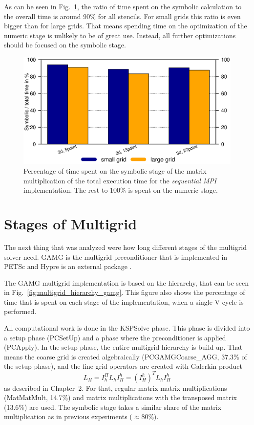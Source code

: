 As can be seen in Fig.~\ref{fig:mpi_symnum}, the ratio of time spent on the symbolic calculation to the overall time is around 90\% for all stencils. For small grids this ratio is even bigger than for large grids. That means spending time on the optimization of the numeric stage is unlikely to be of great use. Instead, all further optimizations should be focused on the symbolic stage. 

\begin{figure}[tbp]
	\centering
	\includegraphics[width=1\textwidth, trim={0 3.cm 0 7cm},clip]{mpi_symnum}
	\caption{Percentage of time spent on the symbolic stage of the matrix multiplication of the total execution time for the \textit{sequential MPI} implementation. The rest to 100\% is spent on the numeric stage.} 
	\label{fig:mpi_symnum}
\end{figure}

\section{Stages of Multigrid}
The next thing that was analyzed were how long different stages of the multigrid solver need. 
GAMG is the multigrid preconditioner that is implemented in PETSc and Hypre is an external package \cite{hypre-web-page}. 

The GAMG multigrid implementation is based on the hierarchy, that can be seen in Fig.~\ref{fig:multigrid_hierarchy_gamg}. This figure also shows the percentage of time that is spent on each stage of the implementation, when a single V-cycle is performed. 

All computational work is done in the KSPSolve phase. This phase is divided into a setup phase (PCSetUp) and a phase where the preconditioner is applied (PCApply). In the setup phase, the entire multigrid hierarchy is build up. That means the coarse grid is created algebraically (PCGAMGCoarse\_AGG, 37.3\% of the setup phase), and the fine grid operators are created with Galerkin product
\begin{equation}
L_H = I_h^H L_h I_H^h = (I_H^h)^T L_h I_H^h
\end{equation}
as described in Chapter~2. For that, regular matrix matrix multiplications (MatMatMult, 14.7\%) and matrix multiplications with the transposed matrix (13.6\%) are used. The symbolic stage takes a similar share of the matrix multiplication as in previous experiments ($\approx 80\%)$.

